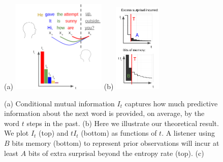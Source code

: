 \begin{figure}
	(a)
\includegraphics[width=0.4\textwidth]{figures-gdrive/mi-distance.png}
	(b)
\includegraphics[width=0.2\textwidth]{figures-gdrive/theorem.png}
	\caption{
		(a) Conditional mutual information $I_t$ captures how much predictive information about the next word is provided, on average, by the word $t$ steps in the past.
		(b) Here we illustrate our theoretical result. We plot $I_t$ (top) and $tI_t$ (bottom) as functions of $t$. A listener using $B$ bits memory (bottom) to represent prior observations will incur at least $A$ bits of extra surprisal beyond the entropy rate (top). 
		(c)  
}\label{fig:theorem}
\end{figure}


